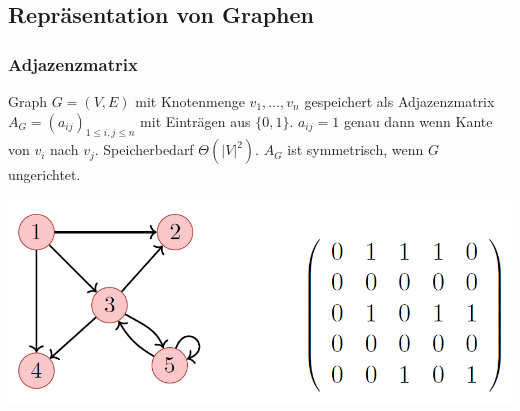 \vspace{-4pt}
\begin{sectionbox}
\subsection{Repräsentation von Graphen}\smallskip

\subsubsection{Adjazenzmatrix}\par\smallskip
Graph $G=(V, E)$ mit Knotenmenge $v_{1}, \ldots, v_{n}$ gespeichert als Adjazenzmatrix $A_{G}=\left(a_{i j}\right)_{1 \leq i, j \leq n}$ mit Einträgen aus $\{0,1\}$. $a_{i j}=1$ genau dann wenn Kante von $v_{i}$ nach $v_{j}$. Speicherbedarf $\Theta\left(|V|^{2}\right)$. $A_{G}$ ist symmetrisch, wenn $G$ ungerichtet.\par\smallskip
\begin{center}
    \includegraphics[width = 0.9\columnwidth]{../img/AdjMa.png}
\end{center}
\end{sectionbox}

